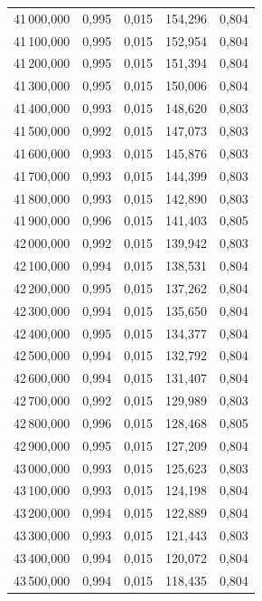 \begin{longtable}{rrrrr}
41\,000,000 & 0,995 & 0,015 & 154,296 & 0,804\\
41\,100,000 & 0,995 & 0,015 & 152,954 & 0,804\\
41\,200,000 & 0,995 & 0,015 & 151,394 & 0,804\\
41\,300,000 & 0,995 & 0,015 & 150,006 & 0,804\\
41\,400,000 & 0,993 & 0,015 & 148,620 & 0,803\\
41\,500,000 & 0,992 & 0,015 & 147,073 & 0,803\\
41\,600,000 & 0,993 & 0,015 & 145,876 & 0,803\\
41\,700,000 & 0,993 & 0,015 & 144,399 & 0,803\\
41\,800,000 & 0,993 & 0,015 & 142,890 & 0,803\\
41\,900,000 & 0,996 & 0,015 & 141,403 & 0,805\\
42\,000,000 & 0,992 & 0,015 & 139,942 & 0,803\\
42\,100,000 & 0,994 & 0,015 & 138,531 & 0,804\\
42\,200,000 & 0,995 & 0,015 & 137,262 & 0,804\\
42\,300,000 & 0,994 & 0,015 & 135,650 & 0,804\\
42\,400,000 & 0,995 & 0,015 & 134,377 & 0,804\\
42\,500,000 & 0,994 & 0,015 & 132,792 & 0,804\\
42\,600,000 & 0,994 & 0,015 & 131,407 & 0,804\\
42\,700,000 & 0,992 & 0,015 & 129,989 & 0,803\\
42\,800,000 & 0,996 & 0,015 & 128,468 & 0,805\\
42\,900,000 & 0,995 & 0,015 & 127,209 & 0,804\\
43\,000,000 & 0,993 & 0,015 & 125,623 & 0,803\\
43\,100,000 & 0,993 & 0,015 & 124,198 & 0,804\\
43\,200,000 & 0,994 & 0,015 & 122,889 & 0,804\\
43\,300,000 & 0,993 & 0,015 & 121,443 & 0,803\\
43\,400,000 & 0,994 & 0,015 & 120,072 & 0,804\\
43\,500,000 & 0,994 & 0,015 & 118,435 & 0,804\\
\end{longtable}
